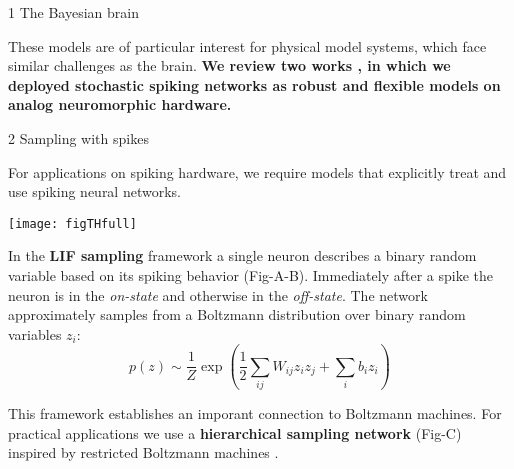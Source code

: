 \begin{frame}
\begin{columns}
\begin{column}{0.99\textwidth}
\begin{columns}[t]
\begin{column}{0.32\textwidth}
\begin{block}{\large 1 The Bayesian brain}
					\begin{adjustwidth}{1cm}{1cm}
					
					These models are of particular interest for physical model systems, which face similar challenges as the brain.
					\textbf{We review two works \cite{dold2019stochasticity,kungl2019accelerated}, in which we deployed stochastic spiking networks as robust and flexible models on  analog neuromorphic hardware.}

					\end{adjustwidth}

					\blockSpaceOne
					\end{block}


					\interBlockSpaceOne



					\begin{block}{\large 2 Sampling with spikes}
					\blockSpaceOne

					\begin{adjustwidth}{1.cm}{1.cm}
					\justifying
					For applications on spiking hardware, we require models that explicitly treat and use spiking neural networks.

					\thirdBlockImSpace					\begin{center}
						\texttt{[image: figTHfull]}
					\end{center}
					\thirdBlockImSpace

					In the \textbf{LIF sampling} framework \cite{petrovici2016stochastic} a single neuron describes a binary random variable based on its spiking behavior (Fig-A-B).
					Immediately after a spike the neuron is in the \emph{on-state} and otherwise in the \emph{off-state}.
					The network approximately samples from a Boltzmann distribution over binary random variables $z_i$:
					\thirdBlockImSpace
					\begin{equation}
					p(z) \sim \frac{1}{Z} \exp \left ( \frac{1}{2} \sum_{ij} W_{ij} z_i z_j + \sum_{i} b_i z_i  \right)
					\end{equation}
					\thirdBlockImSpace
					\end{adjustwidth}
					This framework establishes an imporant connection to Boltzmann machines.
					For practical applications we use a \textbf{hierarchical sampling network} (Fig-C) inspired by restricted Boltzmann machines \cite{hinton1984boltzmann}.



					\blockSpaceOne
					\end{block}



\end{column}
\end{columns}
\end{column}
\end{columns}
\end{frame}
